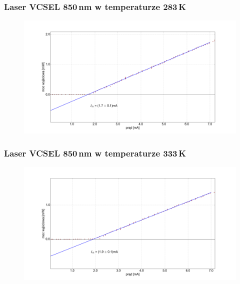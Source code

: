 \documentclass[xcolor={dvipsnames,table}]{beamer}
\begin{document}
\begin{frame}
\frametitle{Laser VCSEL 850\,nm w temperaturze 283\,K}
\center
\begin{figure}
   \includegraphics[width=1.10\textwidth,natwidth=69,natheight=87]{vcsel850/temp_10_fit.png}
\end{figure}
\end{frame}

\begin{frame}
\frametitle{Laser VCSEL 850\,nm w temperaturze 333\,K}
\center
\begin{figure}
   \includegraphics[width=1.10\textwidth,natwidth=69,natheight=87]{vcsel850/temp_60_fit.png}
\end{figure}
\end{frame}
\end{document}
